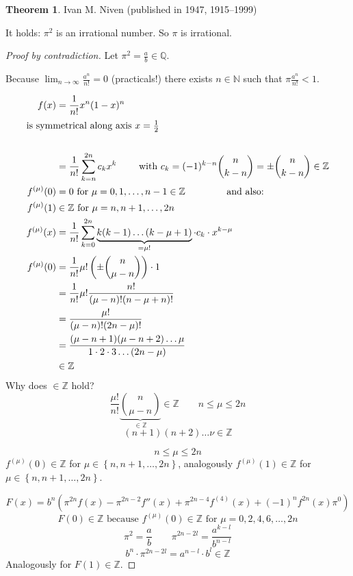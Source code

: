\documentclass[a4paper,landscape,twocolumn]{article}
\theoremstyle{definition}
\newtheorem{theorem}{Theorem}
\newcommand\set[1]{\left\{#1\right\}}
\begin{document}
\begin{theorem}
  Ivan M. Niven (published in 1947, 1915--1999)

  It holds: $\pi^2$ is an irrational number. So $\pi$ is irrational.
\end{theorem}
\begin{proof}[Proof by contradiction]
  Let $\pi^2 = \frac ab \in \mathbb Q$.

  Because $\lim_{n\to\infty} \frac{a^n}{n!} = 0$ (practicals!)
  there exists $n \in \mathbb N$ such that $\pi \frac{a^n}{n!} < 1$.

  \begin{align*}
    f(x) &= \frac1{n!} x^n (1 - x)^n \\
    \intertext{is symmetrical along axis $x = \frac12$} \\
         &= \frac1{n!} \sum_{k=n}^{2n} c_k x^k \qquad \text{ with } c_k = (-1)^{k-n} \binom{n}{k-n} = \pm \binom{n}{k-n} \in \mathbb Z \\
    f^{(\mu)}(0) &= 0 \text{ for } \mu = 0,1,\ldots,n-1 \in \mathbb Z \qquad\qquad \text{ and also:} \\
    f^{(\mu)}(1) &\in \mathbb Z \text{ for } \mu = n, n+1, \ldots, 2n \\
    f^{(\mu)}(x) &= \frac1{n!} \sum_{k=0}^{2n} \underbrace{k (k-1) \ldots (k-\mu+1)}_{= \mu!} \cdot c_k \cdot x^{k-\mu} \\
    f^{(\mu)}(0) &= \frac1{n!} \mu! \left(\pm \binom{n}{\mu-n}\right) \cdot 1 \\
                 &= \frac1{n!} \mu! \frac{n!}{(\mu - n)! (n - \mu + n)!} \\
                 &= \frac{\mu!}{(\mu - n)! (2n - \mu)!} \\
                 &= \frac{(\mu-n+1) (\mu - n + 2) \ldots \mu}{1 \cdot 2 \cdot 3 \ldots (2n - \mu)} \\
                 &\in \mathbb Z
  \end{align*}
  Why does $\in \mathbb Z$ hold?
  \[ \frac{\mu!}{n!} \underbrace{\binom{n}{\mu - n}}_{\in \mathbb Z} \in \mathbb Z \qquad n \leq \mu \leq 2n \]
  \[ (n + 1) (n + 2) \ldots \nu \in \mathbb Z \]

  \[ n \leq \mu \leq 2n \]
  $f^{(\mu)}(0) \in \mathbb Z$ for $\mu \in \set{n, n+1, \ldots, 2n}$, analogously
  $f^{(\mu)}(1) \in \mathbb Z$ for $\mu \in \set{n, n+1, \ldots, 2n}$.

  \[
    F(x) = b^n \left(\pi^{2n} f(x) - \pi^{2n-2} f''(x) + \pi^{2n-4} f^{(4)} (x) + (-1)^n f^{2n}(x) \pi^0\right)
  \] \[
    F(0) \in \mathbb Z \text{ because } f^{(\mu)}(0) \in \mathbb Z \text{ for } \mu = 0,2,4,6,\ldots,2n
  \] \[
    \pi^2 = \frac ab \qquad \pi^{2n - 2l} = \frac{a^{k-l}}{b^{n-l}}
  \] \[
    b^n \cdot \pi^{2n-2l} = a^{n-l} \cdot b^l \in \mathbb Z
  \]
  Analogously for $F(1) \in \mathbb Z$.


\end{proof}
\end{document}
